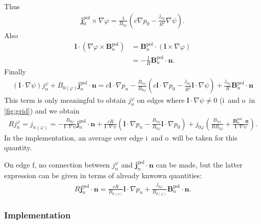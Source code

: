 \documentclass[a4paper, 10pt, english]{article}
\let\temp\varrho
\let\varrho\rho
\let\rho\temp
\let\temp\vartheta
\let\vartheta\theta
\let\theta\temp
\let\temp\varphi
\let\varphi\phi
\let\phi\temp
\let\vec\symbf
\newcommand*\pol{\ensuremath{\textrm{pol}}}  %
\newcommand*\fs{\ensuremath{\textrm{f}}}  %
\newcommand*\inw{\ensuremath{\textrm{i}}}  %
\newcommand*\out{\ensuremath{\textrm{o}}}  %
\begin{document}
Thus
\begin{gather}
  \vec{j}_{0}^{\pol} \times \nabla \phi = \frac{1}{B_{0 \phi}} \left( c \nabla p_{0} - \frac{j_{0 \phi}}{R^{2}} \nabla \psi \right).
\end{gather}
Also
\begin{align}
  \vec{l} \cdot (\nabla \phi \times \vec{B}_{n}^{\pol}) &= \vec{B}_{n}^{\pol} \cdot (\vec{l} \times \nabla \phi) \nonumber \\
  &= -\frac{1}{R} \vec{B}_{n}^{\pol} \cdot \vec{n}.
\end{align}
Finally
\begin{gather}
  (\vec{l} \cdot \nabla \psi) j_{n}^{\phi} + B_{0 (\phi)} \vec{j}_{n}^{\pol} \cdot \vec{n} = c \vec{l} \cdot \nabla p_{n} - \frac{B_{n \phi}}{B_{0 \phi}} \left( c \vec{l} \cdot \nabla p_{0} - \frac{j_{0 \phi}}{R^{2}} \vec{l} \cdot \nabla \psi \right) + \frac{j_{0 \phi}}{R} \vec{B}_{n}^{\pol} \cdot \vec{n} \label{eq:jnphi-jnpol}
\end{gather}
This term is only meaningful to obtain $j_{n}^{\phi}$ on edges where $\vec{l} \cdot \nabla \psi \neq 0$ (\inw\ and \out\ in \cref{fig:grid}) and we obtain
\begin{gather}
  R j_{n}^{\phi} = j_{n (\phi)} = -\frac{B_{0 \phi}}{\vec{l} \cdot \nabla \psi} \vec{j}_{n}^{\pol} \cdot \vec{n} + \frac{c R}{\vec{l} \cdot \nabla \psi} \left( \vec{l} \cdot \nabla p_{n} - \frac{B_{n \phi}}{B_{0 \phi}} \vec{l} \cdot \nabla p_{0} \right) + j_{0 \phi} \left( \frac{B_{n \phi}}{R B_{0 \phi}} + \frac{\vec{B}_{n}^{\pol} \cdot \vec{n}}{\vec{l} \cdot \nabla \psi} \right). \label{eq:jnphi}
\end{gather}
In the implementation, an average over edge \inw\ and \out\ will be taken for this quantity.

On edge \fs, no connection between $j_{n}^{\phi}$ and $\vec{j}_{n}^{\pol} \cdot \vec{n}$ can be made, but the latter expression can be given in terms of already knwown quantities:
\begin{gather}
  R \vec{j}_{n}^{\pol} \cdot \vec{n} = \frac{c R}{B_{0 (\phi)}} \vec{l} \cdot \nabla p_{n} + \frac{j_{0 \phi}}{B_{0 (\phi)}} \vec{B}_{n}^{\pol} \cdot \vec{n}. \label{eq:If}
\end{gather}

\subsubsection{Implementation}
\label{sec:compute_currn}
\end{document}
